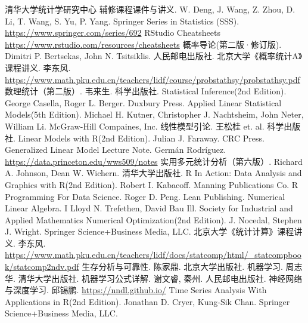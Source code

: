 {}
\begin{thebibliography}{99}
    清华大学统计学研究中心 辅修课程课件与讲义. W. Deng, J. Wang, Z. Zhou, D. Li, T. Wang, S. Yu, P. Yang.
    Springer Series in Statistics (SSS). \url{https://www.springer.com/series/692}
    RStudio Cheatsheets \url{https://www.rstudio.com/resources/cheatsheets}
    概率导论(第二版·修订版). Dimitri P. Bertsekas, John N. Tsitsiklis. 人民邮电出版社.
    北京大学《概率统计A》课程讲义. 李东风. \url{https://www.math.pku.edu.cn/teachers/lidf/course/probstathsy/probstathsy.pdf}
    数理统计（第二版）. 韦来生. 科学出版社.
    Statistical Inference(2nd Edition). George Casella, Roger L. Berger. Duxbury Press.
    Applied Linear Statistical Models(5th Edition). Michael H. Kutner, Christopher J. Nachtsheim, John Neter, William Li. McGraw-Hill Compaines, Inc.
    线性模型引论. 王松桂 et. al. 科学出版社.
    Linear Models with R(2nd Edition). Julian J. Faraway. CRC Press.
    Generalized Linear Model Lecture Note. Germán Rodríguez. \url{https://data.princeton.edu/wws509/notes}
    实用多元统计分析（第六版）. Richard A. Johnson, Dean W. Wichern. 清华大学出版社.
    R In Action: Data Analysis and Graphics with R(2nd Edition). Robert I. Kabacoff. Manning Publications Co.
    R Programming For Data Science. Roger D. Peng. Lean Publishing.
    Numerical Linear Algebra. I Lloyd N. Trefethen, David Bau Ill. Society for Industrial and Applied Mathematics
    Numerical Optimization(2nd Edition). J. Nocedal, Stephen J. Wright. Springer Science+Business Media, LLC. 
    北京大学《统计计算》课程讲义. 李东风. \url{https://www.math.pku.edu.cn/teachers/lidf/docs/statcomp/html/_statcompbook/statcomp2ndv.pdf}
    生存分析与可靠性. 陈家鼎. 北京大学出版社.
    机器学习. 周志华. 清华大学出版社.
    机器学习公式详解. 谢文睿, 秦州. 人民邮电出版社.
    神经网络与深度学习. 邱锡鹏. \url{https://nndl.github.io/}
    Time Series Analysis With Applications in R(2nd Edition). Jonathan D. Cryer, Kung-Sik Chan. Springer Science+Business Media, LLC.

\end{thebibliography}
